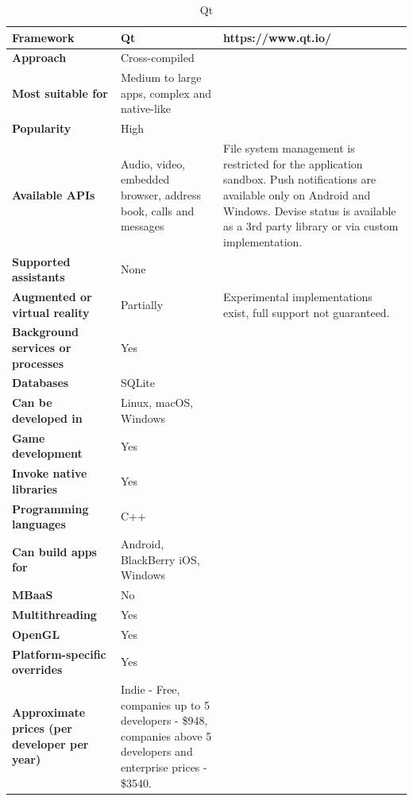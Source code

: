 \documentclass[english,master,public,dept460,male,cpdeclaration,oneside]{diploma}
\begin{document}
\begin{table}[!h]
	\centering
	\caption{Qt}
	\begin{tabular}{p{} | p{} | p{}}
		\toprule		
		\textbf{Framework} & \textbf{Qt} & https://www.qt.io/ \\
		\midrule
		\textbf{Approach} & Cross-compiled & \\			
		\midrule	
		\textbf{Most suitable for} & Medium to large apps, complex and native-like & \\
		\midrule
		\textbf{Popularity} & High & \\			
		\midrule
		\textbf{Available APIs} & Audio, video, embedded browser, address book, calls and messages & File system management is restricted for the application sandbox. Push notifications are available only on Android and Windows. Devise status is available as a 3rd party library or via custom implementation. \\			
		\midrule
		\textbf{Supported assistants} & None & \\			
		\midrule
		\textbf{Augmented or virtual reality} & Partially & Experimental implementations exist, full support not guaranteed. \\			
		\midrule
		\textbf{Background services or processes} & Yes & \\			
		\midrule
		\textbf{Databases} & SQLite & \\			
		\midrule
		\textbf{Can be developed in} & Linux, macOS, Windows &  \\			
		\midrule
		\textbf{Game development} & Yes & \\			
		\midrule
		\textbf{Invoke native libraries} & Yes & \\			
		\midrule
		\textbf{Programming languages} & C++ & \\			
		\midrule
		\textbf{Can build apps for} & Android, BlackBerry iOS, Windows & \\			
		\midrule
		\textbf{MBaaS} & No & \\			
		\midrule
		\textbf{Multithreading} & Yes & \\			
		\midrule
		\textbf{OpenGL} & Yes & \\			
		\midrule
		\textbf{Platform-specific overrides} & Yes & \\			
		\midrule
		\textbf{Approximate prices (per developer per year)} & Indie - Free, companies up to 5 developers - \$948, companies above 5 developers and enterprise prices - \$3540. & \\			
		\midrule
	\end{tabular}
\end{table}
\end{document}
